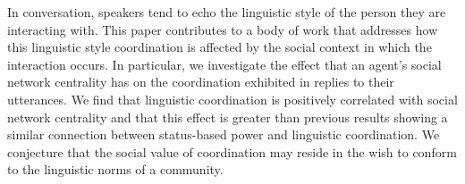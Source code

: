 In conversation, speakers tend to echo the linguistic style of the person they are interacting with. This paper contributes to a body of work that addresses how this linguistic style coordination is affected by the social context in which the interaction occurs. In particular, we investigate the effect that an agent's social network centrality has on the coordination exhibited in replies to their utterances. We find that linguistic coordination is positively correlated with social network centrality and that this effect is greater than previous results showing a similar connection between status-based power and linguistic coordination. We conjecture that the social value of coordination may reside in the wish to conform to the linguistic norms of a community.

